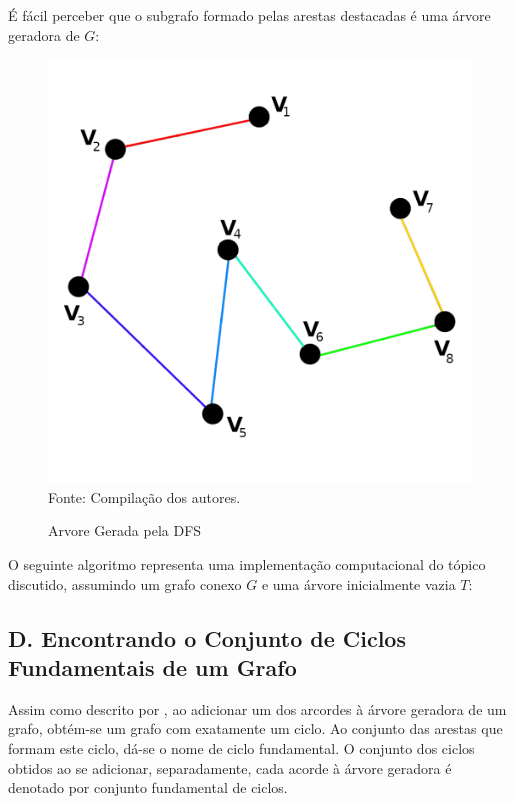 \documentclass[twocolumn, 10pt]{extarticle}
\begin{document}
É fácil perceber que o subgrafo formado pelas arestas destacadas é uma árvore geradora de $G$:

\begin{figure}[H]
	\caption{Arvore Gerada pela DFS} 
	\centering
	\includegraphics[scale=0.6]{spanning2}
	\\ Fonte: Compilação dos autores.
\end{figure}

O seguinte algoritmo representa uma implementação computacional do tópico discutido, assumindo um grafo conexo $G$ e uma árvore inicialmente vazia $T$:

\begingroup
{}\label{st}
\begin{algorithmic}[1]
	\EndFor
\EndFunction
\end{algorithmic}
\hrulefill
\endgroup

\subsection*{D. \quad Encontrando o Conjunto de Ciclos Fundamentais de um Grafo}
Assim como descrito por \cite{krishna}, ao adicionar um dos arcordes à árvore geradora de um grafo, obtém-se um grafo com exatamente um ciclo. Ao conjunto das arestas que formam este ciclo, dá-se o nome de ciclo fundamental. O conjunto dos ciclos obtidos ao se adicionar, separadamente, cada acorde à árvore geradora é denotado por conjunto fundamental de ciclos. 
\end{document}
